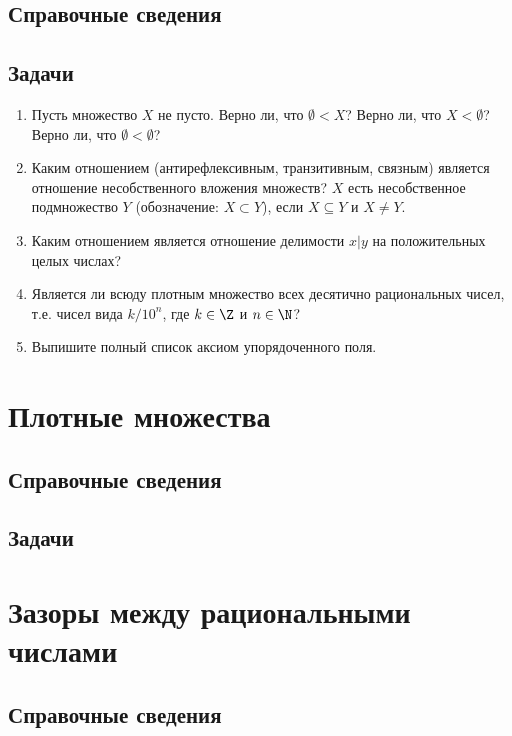 \subsection*{Справочные сведения}

\subsection*{Задачи}

\begin{enumerate}
\item Пусть множество $X$ не пусто. Верно ли, что $\emptyset<X$? Верно ли, что $X<\emptyset$? Верно ли, что $\emptyset<\emptyset$?
\item Каким отношением (антирефлексивным, транзитивным, связным) является отношение несобственного вложения множеств? $X$ есть несобственное подмножество $Y$ (обозначение: $X\subset Y$), если $X\subseteq Y$ и $X\ne Y$.
\item Каким отношением является отношение делимости $x|y$ на положительных целых числах?
\item Является ли всюду плотным множество всех десятично рациональных чисел, т.е. чисел вида $k/10^n$, где $k\in \Z$ и $n\in\N$?
\item Выпишите полный список аксиом упорядоченного поля.
\end{enumerate}


\section{Плотные множества}

\subsection*{Справочные сведения}

\subsection*{Задачи}



\section{Зазоры между рациональными числами}

\subsection*{Справочные сведения}

